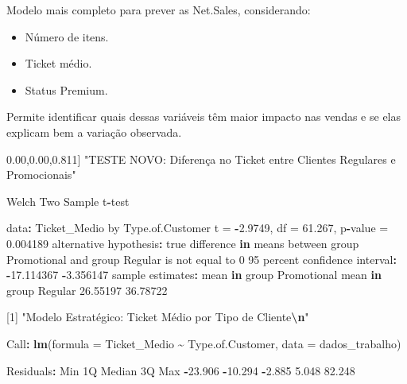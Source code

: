 \documentclass[
]{article}
\newenvironment{Shaded}{\begin{snugshade}}{\end{snugshade}}
\newcommand{\AttributeTok}[1]{\textcolor[rgb]{0.13,0.29,0.53}{#1}}
\newcommand{\ControlFlowTok}[1]{\textcolor[rgb]{0.13,0.29,0.53}{\textbf{#1}}}
\newcommand{\DecValTok}[1]{\textcolor[rgb]{0.00,0.00,0.81}{#1}}
\newcommand{\FloatTok}[1]{\textcolor[rgb]{0.00,0.00,0.81}{#1}}
\newcommand{\FunctionTok}[1]{\textcolor[rgb]{0.13,0.29,0.53}{\textbf{#1}}}
\newcommand{\NormalTok}[1]{#1}
\newcommand{\OtherTok}[1]{\textcolor[rgb]{0.56,0.35,0.01}{#1}}
\newcommand{\SpecialCharTok}[1]{\textcolor[rgb]{0.81,0.36,0.00}{\textbf{#1}}}
\newcommand{\StringTok}[1]{\textcolor[rgb]{0.31,0.60,0.02}{#1}}
\begin{document}
Modelo mais completo para prever as Net.Sales, considerando:

\begin{itemize}
\item
  Número de itens.
\item
  Ticket médio.
\item
  Status Premium.
\end{itemize}

Permite identificar quais dessas variáveis têm maior impacto nas vendas
e se elas explicam bem a variação observada.

\begin{Shaded}
\begin{Highlighting}[]
\NormalTok{[}\DecValTok{1}\NormalTok{] }\StringTok{"TESTE NOVO: Diferença no Ticket entre Clientes Regulares e Promocionais"}

\NormalTok{        Welch Two Sample t}\SpecialCharTok{{-}}\NormalTok{test}

\NormalTok{data}\SpecialCharTok{:}\NormalTok{  Ticket\_Medio by Type.of.Customer}
\NormalTok{t }\OtherTok{=} \SpecialCharTok{{-}}\FloatTok{2.9749}\NormalTok{, df }\OtherTok{=} \FloatTok{61.267}\NormalTok{, p}\SpecialCharTok{{-}}\NormalTok{value }\OtherTok{=} \FloatTok{0.004189}
\NormalTok{alternative hypothesis}\SpecialCharTok{:}\NormalTok{ true difference }\ControlFlowTok{in}\NormalTok{ means between group Promotional and group Regular is not equal to }\DecValTok{0}
\DecValTok{95}\NormalTok{ percent confidence interval}\SpecialCharTok{:}
 \SpecialCharTok{{-}}\FloatTok{17.114367}  \SpecialCharTok{{-}}\FloatTok{3.356147}
\NormalTok{sample estimates}\SpecialCharTok{:}
\NormalTok{mean }\ControlFlowTok{in}\NormalTok{ group Promotional     mean }\ControlFlowTok{in}\NormalTok{ group Regular }
                 \FloatTok{26.55197}                  \FloatTok{36.78722}

\NormalTok{[}\DecValTok{1}\NormalTok{] }\StringTok{"Modelo Estratégico: Ticket Médio por Tipo de Cliente}\SpecialCharTok{\textbackslash{}n}\StringTok{"}

\NormalTok{Call}\SpecialCharTok{:}
\FunctionTok{lm}\NormalTok{(}\AttributeTok{formula =}\NormalTok{ Ticket\_Medio }\SpecialCharTok{\textasciitilde{}}\NormalTok{ Type.of.Customer, }\AttributeTok{data =}\NormalTok{ dados\_trabalho)}

\NormalTok{Residuals}\SpecialCharTok{:}
\NormalTok{    Min      }\DecValTok{1}\NormalTok{Q  Median      }\DecValTok{3}\NormalTok{Q     Max}
\SpecialCharTok{{-}}\FloatTok{23.906} \SpecialCharTok{{-}}\FloatTok{10.294}  \SpecialCharTok{{-}}\FloatTok{2.885}   \FloatTok{5.048}  \FloatTok{82.248}


\end{Highlighting}
\end{Shaded}
\end{document}
